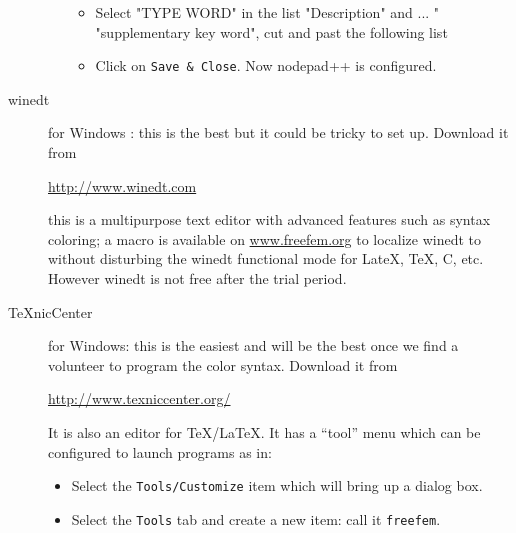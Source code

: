 \documentclass[a4paper,twoside,12pt]{book}
\begin{document}
\begin{description}
\begin{itemize}
\begin{itemize}
\item Select "TYPE WORD" in the list "Description" and ... " "supplementary key word",
cut and past the following list


\item Click on \texttt{Save \& Close}.  Now nodepad++ is configured.
\end{itemize}
\end{itemize}

%
%

\item[winedt] for Windows : this is the best but it could be tricky to set up.  Download it from
\begin{center}
 \url{http://www.winedt.com}
 \end{center}
this is a multipurpose text editor  with advanced features
such as syntax coloring; a macro is available on \url{www.freefem.org} to localize winedt to \freefempp
without disturbing the winedt functional mode for LateX, TeX, C, etc.  However winedt is not free
after the trial period.

\item[TeXnicCenter] for Windows: this is the easiest and will be the best once we find a volunteer
to program the color syntax.  Download it from
\begin{center}\url{http://www.texniccenter.org/}\end{center}
It is also an editor for TeX/LaTeX. It has a ``tool'' menu which can be configured to launch
\freefempp programs as in:
\begin{itemize}
\item Select the \texttt{Tools/Customize} item which will bring up a dialog box.
\item Select the  \texttt{Tools} tab and  create a new item: call it \texttt{freefem}.


\end{itemize}
\end{description}
\end{document}

